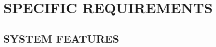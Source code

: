 \documentclass[letterpaper, 10pt, draftclsnofoot, onecolumn]{IEEEtran}
\begin{document}
{\begin{comment}
\end{comment}
\clearpage\setcounter{page}{1}\pagestyle{Convertv}

\section[SPECIFIC
REQUIREMENTS]{\rmfamily\bfseries\color{black}
SPECIFIC REQUIREMENTS}


\subsection[SYSTEM
FEATURES]{\rmfamily\bfseries\color{black}
SYSTEM FEATURES}


\begin{comment}

{\selectlanguage{english}\itshape\color{black}
Functional requirements should define the fundamental actions (i.e.,
features) \ that must take place in the software in accepting and
processing the inputs and in processing and generating the outputs.
These requirements are given in the form of \textbf{Use Cases} where
possible, denoting a concrete use (discrete user-performable task) of
the system. Use case diagrams are followed by use case descriptions,
followed by any non-task features. Non-task features are generally
listed as {\textquotedblleft}shall{\textquotedblright} statements
starting with {\textquotedblleft}The system
shall{\dots}{\textquotedblright} \ These include: a) Validity checks on
the inputs; b) Exact sequence of operations; c) Responses to abnormal
situations, including error detection, handling and recovery; d)
Parameter specification and usage; e) Relationship of outputs to
inputs, including formulas for input to output conversion. \newline
\newline
It may be appropriate to partition the functional requirements into sub
functions or subprocesses, but that decomposition (here) does not imply
that the software design will also be partitioned that way. \ You
should repeat subsections 3.2.i for every specified feature defined for
the system or software.}

\subsubsection[\ Use Case
Diagrams]{\foreignlanguage{english}{\ }\foreignlanguage{english}{Use
Case Diagrams}}
{\selectlanguage{english}\color{black}
[insert 1+ use case diagrams here]}


\end{comment}}
\end{document}
